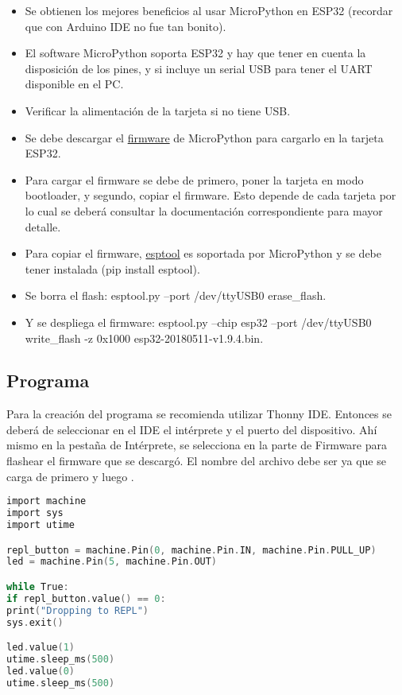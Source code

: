 \documentclass[conference]{IEEEtran}
\begin{document}
\begin{itemize}
\item Se obtienen los mejores beneficios al usar MicroPython en ESP32
(recordar que con Arduino IDE no fue tan bonito).

\item El software MicroPython soporta ESP32 y hay que tener en cuenta la
disposición de los pines, y si incluye un serial USB para tener el UART
disponible en el PC.

\item Verificar la alimentación de la tarjeta si no tiene USB.

\item Se debe descargar el \href{https://micropython.org/download/#esp32}{firmware}
de MicroPython para cargarlo en la tarjeta ESP32.

\item Para cargar el firmware se debe de primero, poner la tarjeta en modo
bootloader, y segundo, copiar el firmware. Esto depende de cada tarjeta por
lo cual se deberá consultar la documentación correspondiente para mayor detalle.

\item Para copiar el firmware, \href{https://github.com/espressif/esptool}{esptool}
es soportada por MicroPython y se debe tener instalada (pip install esptool).

\item Se borra el flash: esptool.py --port /dev/ttyUSB0 erase\_flash.

\item Y se despliega el firmware: esptool.py --chip esp32 --port /dev/ttyUSB0
write\_flash -z 0x1000 esp32-20180511-v1.9.4.bin.
\end{itemize}

\subsection{Programa}

Para la creación del programa se recomienda utilizar Thonny IDE. Entonces se
deberá de seleccionar en el IDE el intérprete y el puerto del dispositivo.
Ahí mismo en la pestaña de Intérprete, se selecciona en la parte de Firmware
para flashear el firmware que se descargó. El nombre del archivo debe ser
 ya que se carga  de primero y luego .

\bigbreak

\begin{lstlisting}[language=C, caption={Programa que hace parpadear un LED
hasta que se presiona el botón de salir en MicroPython. Fuente: Sparkfun
Electronics \cite{hymel}.}]
import machine
import sys
import utime

repl_button = machine.Pin(0, machine.Pin.IN, machine.Pin.PULL_UP)
led = machine.Pin(5, machine.Pin.OUT)

while True:
if repl_button.value() == 0:
print("Dropping to REPL")
sys.exit()

led.value(1)
utime.sleep_ms(500)
led.value(0)
utime.sleep_ms(500)
\end{lstlisting}
\end{document}
